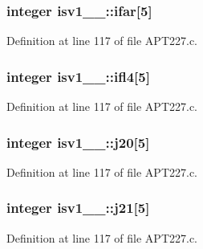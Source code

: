 \subsubsection[{\texorpdfstring{ifar}{ifar}}]{\setlength{\rightskip}{0pt plus 5cm}integer isv1\+\_\+\_\+\+::ifar\mbox{[}5\mbox{]}}\hypertarget{structisv1__1___a6c06e352e7758bbb3a871de7db0337f9}{}\label{structisv1__1___a6c06e352e7758bbb3a871de7db0337f9}


Definition at line 117 of file A\+P\+T227.\+c.

\subsubsection[{\texorpdfstring{ifl4}{ifl4}}]{\setlength{\rightskip}{0pt plus 5cm}integer isv1\+\_\+\_\+\+::ifl4\mbox{[}5\mbox{]}}\hypertarget{structisv1__1___aa428b6773abd501a0dd6db7ebd1f5e34}{}\label{structisv1__1___aa428b6773abd501a0dd6db7ebd1f5e34}


Definition at line 117 of file A\+P\+T227.\+c.

\subsubsection[{\texorpdfstring{j20}{j20}}]{\setlength{\rightskip}{0pt plus 5cm}integer isv1\+\_\+\_\+\+::j20\mbox{[}5\mbox{]}}\hypertarget{structisv1__1___a322fa494fd3c26d57e30a0a4f659eff9}{}\label{structisv1__1___a322fa494fd3c26d57e30a0a4f659eff9}


Definition at line 117 of file A\+P\+T227.\+c.

\subsubsection[{\texorpdfstring{j21}{j21}}]{\setlength{\rightskip}{0pt plus 5cm}integer isv1\+\_\+\_\+\+::j21\mbox{[}5\mbox{]}}\hypertarget{structisv1__1___ac4cfebba4c2bc9e83d7b94d638755b06}{}\label{structisv1__1___ac4cfebba4c2bc9e83d7b94d638755b06}


Definition at line 117 of file A\+P\+T227.\+c.

